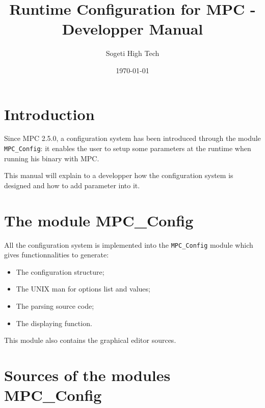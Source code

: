 \documentclass{article}
\author{Sogeti High Tech}
\title{Runtime Configuration for MPC - Developper Manual}
\date{\today}
\begin{document}
\hypersetup{pageanchor=false,citecolor=blue}
\maketitle

\newpage
{}
\tableofcontents
\newpage
{}
\hypersetup{pageanchor=true,citecolor=blue}

\section{Introduction}

Since MPC 2.5.0, a configuration system has been introduced through the module \texttt{MPC\_Config}: it enables the user to setup some parameters at the runtime when running his binary with MPC.
\newline

\noindent This manual will explain to a developper how the configuration system is designed and how to add parameter into it.

\section{The module MPC\_Config}

All the configuration system is implemented into the \texttt{MPC\_Config} module which gives functionnalities to generate:
\begin{itemize}
\item The configuration structure;
\item The UNIX man for options list and values;
\item The parsing source code;
\item The displaying function.
\end{itemize}

\noindent This module also contains the graphical editor sources.

\newpage

\section{Sources of the modules MPC\_Config}
\end{document}
